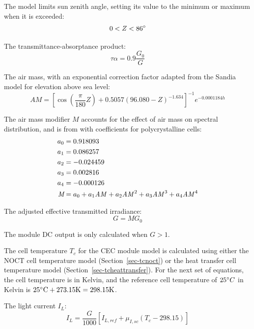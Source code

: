 \documentclass[12pt,letterpaper]{article}
\begin{document}
The model limits sun zenith angle, setting its value to the minimum or maximum when it is exceeded:
\begin{equation}
0 < Z < 86\degree  
\end{equation}

The transmittance-absorptance product:
\begin{equation}
\tau\alpha = 0.9 \frac{G_0}{G}
\end{equation}

The air mass, with an exponential correction factor adapted from the Sandia model for elevation above sea level:
\begin{equation}\label{eqn-cecam}
\textit{AM} = \left[\cos\left( \frac{\pi}{180}Z \right)+0.5057(96.080-Z)^{-1.634} \right]^{-1} e^{-0.0001184\mathit{h}}
\end{equation}

The air mass modifier $M$ accounts for the effect of air mass on spectral distribution, and is from \citet{king2004} with coefficients for polycrystalline cells:
\begin{align}
a_0 &= 0.918093 \notag\\
a_1 &= 0.086257 \notag\\
a_2 &= -0.024459 \notag\\
a_3 &= 0.002816 \notag\\
a_4 &= -0.000126 \notag\\
\textit{M} &= a_0 + a_1 \mathit{AM} + a_2 \mathit{AM}^2 + a_3\mathit{AM}^3+ a_4\mathit{AM}^4
\end{align}

The adjusted effective transmitted irradiance:
\begin{equation}\label{eqn-effectivetransmittedirradiance}
G =  MG_0
\end{equation}

The module DC output is only calculated when $G>1$.

The cell temperature $T_c$ for the CEC module model is calculated using either the NOCT cell temperature model (Section~\ref{sec-tcnoct}) or the heat transfer cell temperature model (Section~\ref{sec-tcheattransfer}). For the next set of equations, the cell temperature is in Kelvin, and the reference cell temperature of $25\degree C$ in Kelvin is $25\degree \text{C} + 273.15 \text{K} = 298.15 \text{K}$.

The light current $I_L$:
\begin{equation}\label{eqn-lightcurrent}
I_L = \frac{G}{1000}\left[I_{L,ref} + \mu_{I,sc} (T_c - 298.15 )\right]
\end{equation}
\end{document}
